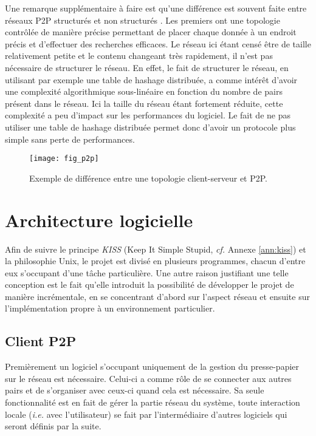 Une remarque supplémentaire à faire est qu'une différence est souvent faite
entre réseaux P2P structurés et non structurés \cite{AS04, Lua05asurvey}.
Les premiers ont une topologie contrôlée de manière précise permettant
de placer chaque donnée à un endroit précis et d'effectuer des recherches
efficaces. Le réseau ici étant censé être de taille relativement petite
et le contenu changeant très rapidement, il n'est pas nécessaire de structurer
le réseau. En effet, le fait de structurer le réseau, en utilisant par exemple
une table de hashage distribuée, a comme intérêt d'avoir une complexité
algorithmique sous-linéaire en fonction du nombre de pairs présent dans
le réseau. Ici la taille du réseau étant fortement réduite, cette
complexité a peu d'impact sur les performances du logiciel. Le fait de ne
pas utiliser une table de hashage distribuée permet donc d'avoir un protocole
plus simple sans perte de performances.

\begin{figure}[!h]
  \centering
  \texttt{[image: fig\_p2p]}
  \caption{Exemple de différence entre une topologie client-serveur et P2P.}
  \label{fig:p2p}
\end{figure}

\section{Architecture logicielle}
Afin de suivre le principe \emph{KISS} (Keep It Simple Stupid, \emph{cf.}
Annexe \ref{ann:kiss}) et la philosophie Unix, le projet est divisé en
plusieurs programmes, chacun d'entre eux s'occupant d'une tâche particulière.
Une autre raison justifiant une telle conception est le fait qu'elle introduit
la possibilité de développer le projet de manière incrémentale, en se
concentrant d'abord sur l'aspect réseau et ensuite sur l'implémentation
propre à un environnement particulier.

\subsection{Client P2P}
Premièrement un logiciel s'occupant uniquement de la gestion du presse-papier
sur le réseau est nécessaire. Celui-ci a comme rôle de se connecter aux
autres pairs et de s'organiser avec ceux-ci quand cela est nécessaire.
Sa seule fonctionnalité est en fait de gérer la partie réseau du système,
toute interaction locale (\emph{i.e.} avec l'utilisateur) se fait par
l'intermédiaire d'autres logiciels qui seront définis par la suite.


